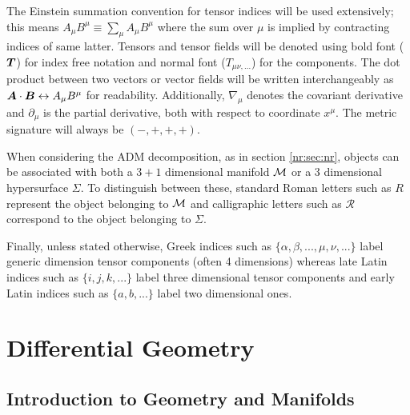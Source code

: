 The Einstein summation convention for tensor indices will be used extensively; this means $A_\mu B^\mu \equiv \sum_{\mu} A_\mu B^\mu$ where the sum over $\mu$ is implied by contracting indices of same latter. Tensors and tensor fields will be denoted using bold font ($\boldsymbol{T}$) for
index free notation and normal font ($T_{\mu\nu,...}$) for the components.
The dot product between two vectors or vector fields will be written interchangeably as $\boldsymbol{A} \cdot \boldsymbol{B} \leftrightarrow {A}_\mu {B}^\mu$ for readability.
Additionally, $\nabla_\mu$ denotes the covariant derivative and $\partial_\mu$
is the partial derivative, both with respect to coordinate $x^\mu$. The metric signature will always be $(-,+,+,+)$. 

When considering the ADM decomposition, as in section \ref{nr:sec:nr}, objects can be associated with both a $3+1$ dimensional manifold $\mathcal{M}$ or a $3$ dimensional hypersurface $\Sigma$. To distinguish between these, standard Roman letters such as $R$ represent the object belonging to $\mathcal{M}$ and calligraphic letters such as $\mathcal{R}$ correspond to the object belonging to $\Sigma$. 

Finally, unless stated otherwise, Greek indices such
as $\{\alpha, \beta, ..., \mu, \nu, ...\}$ label generic dimension tensor components (often 4 dimensions) whereas late Latin indices such as $\{i, j, k, ...\}$ label
three dimensional tensor components and early Latin indices such as $\{a, b, ...\}$ label two dimensional ones. 



\newpage
\section{Differential Geometry}
\subsection{Introduction to Geometry and Manifolds}





